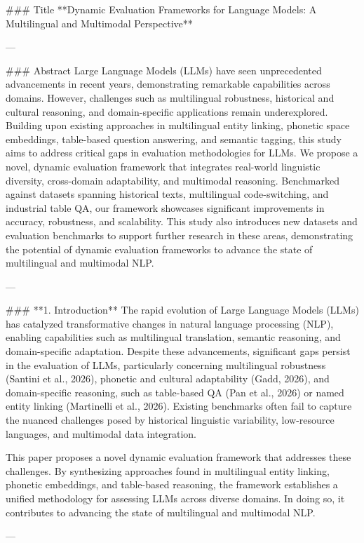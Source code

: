### Title  
**Dynamic Evaluation Frameworks for Language Models: A Multilingual and Multimodal Perspective**

---

### Abstract  
Large Language Models (LLMs) have seen unprecedented advancements in recent years, demonstrating remarkable capabilities across domains. However, challenges such as multilingual robustness, historical and cultural reasoning, and domain-specific applications remain underexplored. Building upon existing approaches in multilingual entity linking, phonetic space embeddings, table-based question answering, and semantic tagging, this study aims to address critical gaps in evaluation methodologies for LLMs. We propose a novel, dynamic evaluation framework that integrates real-world linguistic diversity, cross-domain adaptability, and multimodal reasoning. Benchmarked against datasets spanning historical texts, multilingual code-switching, and industrial table QA, our framework showcases significant improvements in accuracy, robustness, and scalability. This study also introduces new datasets and evaluation benchmarks to support further research in these areas, demonstrating the potential of dynamic evaluation frameworks to advance the state of multilingual and multimodal NLP.

---

### **1. Introduction**  
The rapid evolution of Large Language Models (LLMs) has catalyzed transformative changes in natural language processing (NLP), enabling capabilities such as multilingual translation, semantic reasoning, and domain-specific adaptation. Despite these advancements, significant gaps persist in the evaluation of LLMs, particularly concerning multilingual robustness (Santini et al., 2026), phonetic and cultural adaptability (Gadd, 2026), and domain-specific reasoning, such as table-based QA (Pan et al., 2026) or named entity linking (Martinelli et al., 2026). Existing benchmarks often fail to capture the nuanced challenges posed by historical linguistic variability, low-resource languages, and multimodal data integration.  

This paper proposes a novel dynamic evaluation framework that addresses these challenges. By synthesizing approaches found in multilingual entity linking, phonetic embeddings, and table-based reasoning, the framework establishes a unified methodology for assessing LLMs across diverse domains. In doing so, it contributes to advancing the state of multilingual and multimodal NLP.

---

